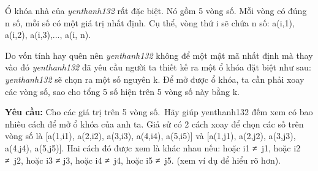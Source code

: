 Ổ khóa nhà của \emph{ yenthanh132 } rất đặc biệt. Nó gồm 5 vòng số. Mỗi vòng có đúng n số, mỗi số có một giá trị nhất định. Cụ thể, vòng thứ i sẽ chứa n số: a(i,1), a(i,2), a(i,3),..., a(i, n).

Do vốn tính hay quên nên \emph{ yenthanh132 } không để một mật mã nhất định mà thay vào đó \emph{ yenthanh132 } đã yêu cầu người ta thiết kế ra một ổ khóa đặt biệt như sau: \emph{ yenthanh132 } sẽ chọn ra một số nguyên k. Để mở được ổ khóa, ta cần phải xoay các vòng số, sao cho tổng 5 số hiện trên 5 vòng số này bằng k.

\textbf{Yêu cầu: } Cho các giá trị trên 5 vòng số. Hãy giúp yenthanh132 đếm xem có bao nhiêu cách để mở ổ khóa của anh ta. Giả sử có 2 cách xoay để chọn các số trên vòng số là [a(1,i1), a(2,i2), a(3,i3), a(4,i4), a(5,i5)] và [a(1,j1), a(2,j2), a(3,j3), a(4,j4), a(5,j5)]. Hai cách đó được xem là khác nhau nếu: hoặc i1 ≠ j1, hoặc i2 ≠ j2, hoặc i3 ≠ j3, hoặc i4 ≠ j4, hoặc i5 ≠ j5. (xem ví dụ để hiểu rõ hơn).